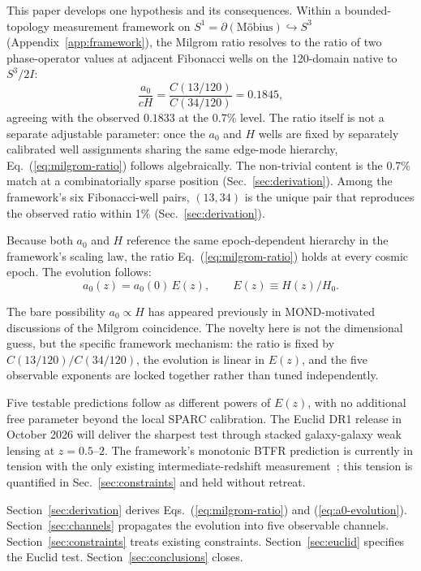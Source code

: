 \documentclass[
    aps,
    prd,
    reprint,
    superscriptaddress,
    nofootinbib,
    floatfix
]{revtex4-2}
\begin{document}
This paper develops one hypothesis and its consequences. Within a
bounded-topology measurement framework on
$S^1 = \partial(\text{M\"obius}) \hookrightarrow S^3$
(Appendix~\ref{app:framework}), the Milgrom ratio resolves to the ratio
of two phase-operator values at adjacent Fibonacci wells on the
120-domain native to $S^3/2I$:
\begin{equation}
\frac{a_0}{cH} = \frac{C(13/120)}{C(34/120)} = 0.1845,
\label{eq:milgrom-ratio}
\end{equation}
agreeing with the observed $0.1833$ at the $0.7\%$ level. The ratio
itself is not a separate adjustable parameter: once the $a_0$ and $H$
wells are fixed by separately calibrated well assignments sharing the
same edge-mode hierarchy, Eq.~(\ref{eq:milgrom-ratio}) follows
algebraically. The non-trivial content is the 0.7\% match at a
combinatorially sparse position (Sec.~\ref{sec:derivation}). Among the
framework's six Fibonacci-well pairs, $(13, 34)$ is the unique pair
that reproduces the observed ratio within 1\%
(Sec.~\ref{sec:derivation}).

Because both $a_0$ and $H$ reference the same epoch-dependent
hierarchy in the framework's scaling law, the ratio
Eq.~(\ref{eq:milgrom-ratio}) holds at every cosmic epoch. The evolution
follows:
\begin{equation}
a_0(z) = a_0(0)\,E(z), \qquad E(z) \equiv H(z)/H_0.
\label{eq:a0-evolution}
\end{equation}

The bare possibility $a_0 \propto H$ has appeared previously in
MOND-motivated discussions of the Milgrom coincidence. The novelty
here is not the dimensional guess, but the specific framework
mechanism: the ratio is fixed by $C(13/120)/C(34/120)$, the evolution
is linear in $E(z)$, and the five observable exponents are locked
together rather than tuned independently.

Five testable predictions follow as different powers of $E(z)$, with
no additional free parameter beyond the local SPARC calibration. The
Euclid DR1 release in October 2026 will deliver the sharpest test
through stacked galaxy-galaxy weak lensing at $z = 0.5\text{--}2$. The
framework's monotonic BTFR prediction is currently in tension with the
only existing intermediate-redshift measurement~\cite{Ubler2017}; this
tension is quantified in Sec.~\ref{sec:constraints} and held without
retreat.

Section~\ref{sec:derivation} derives Eqs.~(\ref{eq:milgrom-ratio}) and
(\ref{eq:a0-evolution}). Section~\ref{sec:channels} propagates the
evolution into five observable channels.
Section~\ref{sec:constraints} treats existing constraints.
Section~\ref{sec:euclid} specifies the Euclid test.
Section~\ref{sec:conclusions} closes.
\end{document}
